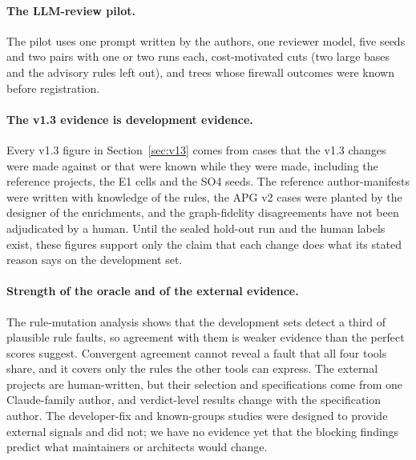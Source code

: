 \documentclass[10pt,a4paper]{article}
\begin{document}
\paragraph{The LLM-review pilot.}
The pilot uses one prompt written by the authors, one reviewer model, five seeds and two pairs with one or two runs
each, cost-motivated cuts (two large bases and the advisory rules left out), and trees whose firewall outcomes were
known before registration. %

\paragraph{The v1.3 evidence is development evidence.}
Every v1.3 figure in Section~\ref{sec:v13} comes from cases that the v1.3 changes were made against or that were
known while they were made, including the reference projects, the E1 cells and the SO4 seeds. The reference
author-manifests were written with knowledge of the rules, the APG v2 cases were planted by the designer of the
enrichments, and the graph-fidelity disagreements have not been adjudicated by a human. Until the sealed hold-out
run and the human labels exist, these figures support only the claim that each change does what its stated reason
says on the development set. %

\paragraph{Strength of the oracle and of the external evidence.}
The rule-mutation analysis shows that the development sets detect a third of plausible rule faults, so agreement
with them is weaker evidence than the perfect scores suggest. Convergent agreement cannot reveal a fault that all
four tools share, and it covers only the rules the other tools can express. The external projects are human-written,
but their selection and specifications come from one Claude-family author, and verdict-level results change with
the specification author. The developer-fix and known-groups studies were designed to provide external signals and
did not; we have no evidence yet that the blocking findings predict what maintainers or architects would change.
\end{document}
